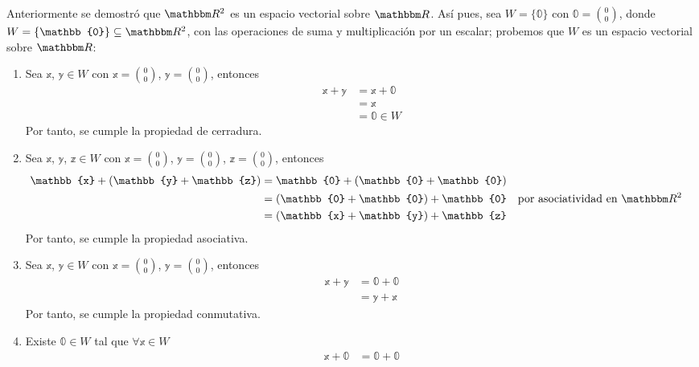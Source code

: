 \begin{example}
    Anteriormente se demostró que $\RR[2]$ es un espacio vectorial sobre $\RR$. Así pues, sea $W = \{ \mathbb{0} \}$ con $\displaystyle \mathbb{0} = \binom{0}{0}$, donde $W = \{ \mathbb{0} \} \subseteq \RR[2]$, con las operaciones de suma y multiplicación por un escalar; probemos que $W$ es un espacio vectorial sobre $\RR$:
    \newpage
    \begin{enumerate}[label=\roman*)]
        \item Sea $\mathbb{x}$, $\mathbb{y} \in W$ con $\displaystyle \mathbb{x} = \binom{0}{0}$, $\displaystyle \mathbb{y} = \binom{0}{0}$, entonces
        \begin{align*}
            \mathbb{x} + \mathbb{y} & = \mathbb{x} + \mathbb{0} \\
            & = \mathbb{x} \\
            & = \mathbb{0} \in W
        \end{align*}
        Por tanto, se cumple la propiedad de cerradura.
        \item Sea $\mathbb{x}$, $\mathbb{y}$, $\mathbb{z} \in W$ con $\displaystyle \mathbb{x} = \binom{0}{0}$, $\displaystyle \mathbb{y} = \binom{0}{0}$, $\displaystyle \mathbb{z} = \binom{0}{0}$, entonces
        \begin{align*}
            \mathbb{x} + (\mathbb{y} + \mathbb{z}) & = \mathbb{0} + (\mathbb{0} + \mathbb{0}) \\
            & = (\mathbb{0} + \mathbb{0}) + \mathbb{0} && \text{por asociatividad en $\RR[2]$} \\
            & = (\mathbb{x} + \mathbb{y}) + \mathbb{z}
        \end{align*}
        Por tanto, se cumple la propiedad asociativa.
        \item Sea $\mathbb{x}$, $\mathbb{y} \in W$ con $\displaystyle \mathbb{x} = \binom{0}{0}$, $\displaystyle \mathbb{y} = \binom{0}{0}$, entonces
        \begin{align*}
            \mathbb{x} + \mathbb{y} & = \mathbb{0} + \mathbb{0} \\
            & = \mathbb{y} + \mathbb{x}
        \end{align*}
        Por tanto, se cumple la propiedad conmutativa.
        \item Existe $\mathbb{0} \in W$ tal que $\forall \mathbb{x} \in W$
        \begin{align*}
            \mathbb{x} + \mathbb{0} & = \mathbb{0} + \mathbb{0} \\

\end{align*}
\end{enumerate}
\end{example}
